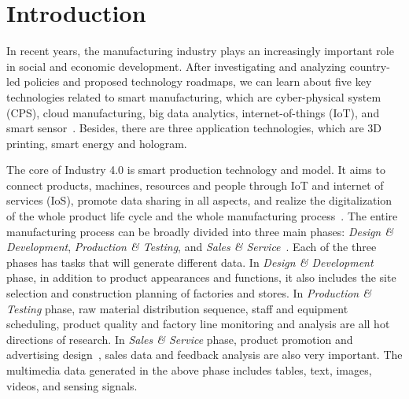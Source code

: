 \documentclass[a4paper,fleqn]{cas-dc}
\begin{document}
\section{Introduction}
In recent years, the manufacturing industry plays an increasingly important role in social and economic development.
After investigating and analyzing country-led policies and proposed technology roadmaps, we can learn about five key technologies related to smart manufacturing, which are cyber-physical system (CPS), cloud manufacturing, big data analytics, internet-of-things (IoT), and smart sensor~\cite{Gehlot2022,Kang2016}.
Besides, there are three application technologies, which are 3D printing, smart energy and hologram.

The core of Industry 4.0 is smart production technology and model. It aims to connect products, machines, resources and people through IoT and internet of services (IoS), promote data sharing in all aspects, and realize the digitalization of the whole product life cycle and the whole manufacturing process~\cite{Cardoso2010,Gubbi2013}.
The entire manufacturing process can be broadly divided into three main phases: \textit{Design \& Development}, \textit{Production \& Testing}, and \textit{Sales \& Service}~\cite{Zhou2019}.
Each of the three phases has tasks that will generate different data.
In \textit{Design \& Development} phase, in addition to product appearances and functions, it also includes the site selection and construction planning of factories and stores.
In \textit{Production \& Testing} phase, raw material distribution sequence, staff and equipment scheduling, product quality and factory line monitoring and analysis are all hot directions of research.
In \textit{Sales \& Service} phase, product promotion and advertising design~\cite{Guo2021}, sales data and feedback analysis are also very important.
The multimedia data generated in the above phase includes tables, text, images, videos, and sensing signals.
\end{document}
